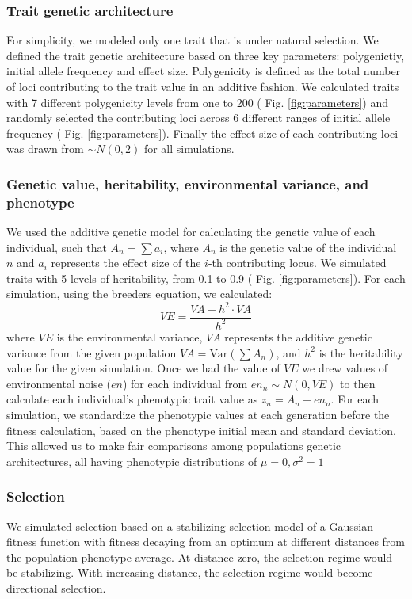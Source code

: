 \documentclass{article}
\begin{document}
\subsubsection{Trait genetic architecture}
For simplicity, we modeled only one trait that is under natural selection. We defined the trait genetic architecture based on three key parameters: polygenictiy, initial allele frequency and effect size. Polygenicity is defined as the total number of loci contributing to the trait value in an additive fashion. We calculated traits with 7 different polygenicity levels from one to 200 ( Fig. \ref{fig:parameters}) and randomly selected the contributing loci across 6 different ranges of initial allele frequency ( Fig. \ref{fig:parameters}). Finally the effect size of each contributing loci was drawn from \( \sim N(0, 2) \) for all simulations.

\subsubsection{Genetic value, heritability, environmental variance, and phenotype}
We used the additive genetic model for calculating the genetic value of each individual, such that $A_n=\sum a_i$, where $A_n$ is the genetic value of the individual $n$ and \( a_i \) represents the effect size of the \( i \)-th contributing locus. We simulated traits with 5 levels of heritability, from 0.1 to 0.9 ( Fig. \ref{fig:parameters}). For each simulation, using the breeders equation, we calculated:
\[
VE = \frac{VA - h^2 \cdot VA}{h^2}
\]
where \( VE \) is the environmental variance, \(VA\) represents the additive genetic variance from the given population \( VA = \text{Var}\left(\sum A_n\right) \), and \( h^2 \) is the heritability value for the given simulation. Once we had the value of \( VE \) we drew values of environmental noise (\( en \)) for each individual from \( en_n \sim N(0, VE) \) to then calculate each individual's phenotypic trait value as \( z_n = A_n+ en_n \). For each simulation, we standardize the phenotypic values at each generation before the fitness calculation, based on the phenotype initial mean and standard deviation. This allowed us to make fair comparisons among populations genetic architectures, all having phenotypic distributions of $\mu = 0, \sigma^2 = 1$

\subsubsection{Selection}
We simulated selection based on a stabilizing selection model of a Gaussian fitness function with fitness decaying from an optimum at different distances from the population phenotype average. At distance zero, the selection regime would be stabilizing. With increasing distance, the selection regime would become directional selection. 
\end{document}
